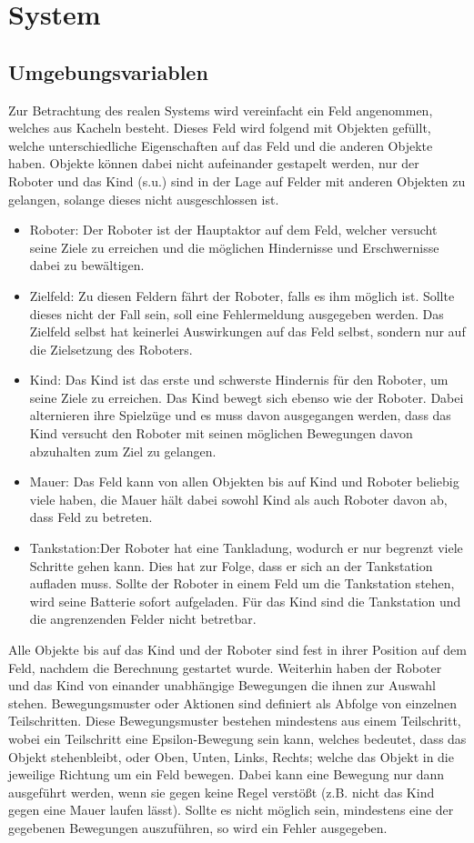 \section{System}
\subsection{Umgebungsvariablen}
Zur Betrachtung des realen Systems wird vereinfacht ein Feld angenommen, welches aus Kacheln besteht. Dieses Feld wird folgend mit Objekten gefüllt, welche unterschiedliche Eigenschaften auf das Feld und die anderen Objekte haben. Objekte können dabei nicht aufeinander gestapelt werden, nur der Roboter und das Kind (s.u.) sind in der Lage auf Felder mit anderen Objekten zu gelangen, solange dieses nicht ausgeschlossen ist.
\begin{itemize}
	\item Roboter: Der Roboter ist der Hauptaktor auf dem Feld, welcher versucht seine Ziele zu erreichen und die möglichen Hindernisse und Erschwernisse dabei zu bewältigen.
	\item Zielfeld: Zu diesen Feldern fährt der Roboter, falls es ihm möglich ist. Sollte dieses nicht der Fall sein, soll eine Fehlermeldung ausgegeben werden. Das Zielfeld selbst hat keinerlei Auswirkungen auf das Feld selbst, sondern nur auf die Zielsetzung des Roboters.
	\item Kind: Das Kind ist das erste und schwerste Hindernis für den Roboter, um seine Ziele zu erreichen. Das Kind bewegt sich ebenso wie der Roboter. Dabei alternieren ihre Spielzüge und es muss davon ausgegangen werden, dass das Kind versucht den Roboter mit seinen möglichen Bewegungen davon abzuhalten zum Ziel zu gelangen.
	\item Mauer: Das Feld kann von allen Objekten bis auf Kind und Roboter beliebig viele haben, die Mauer hält dabei sowohl Kind als auch Roboter davon ab, dass Feld zu betreten.
	\item Tankstation:Der Roboter hat eine Tankladung, wodurch er nur begrenzt viele Schritte gehen kann. Dies hat zur Folge, dass er sich an der Tankstation aufladen muss. Sollte der Roboter in einem Feld um die Tankstation stehen, wird seine Batterie sofort aufgeladen. Für das Kind sind die Tankstation und die angrenzenden Felder nicht betretbar.
\end{itemize}
Alle Objekte bis auf das Kind und der Roboter sind fest in ihrer Position auf dem Feld, nachdem die Berechnung gestartet wurde. Weiterhin haben der Roboter und das Kind von einander unabhängige Bewegungen die ihnen zur Auswahl stehen. Bewegungsmuster oder Aktionen sind definiert als Abfolge von einzelnen Teilschritten. Diese Bewegungsmuster bestehen mindestens aus einem Teilschritt, wobei ein Teilschritt eine Epsilon-Bewegung sein kann, welches bedeutet, dass das Objekt stehenbleibt, oder Oben, Unten, Links, Rechts; welche das Objekt in die jeweilige Richtung um ein Feld bewegen. Dabei kann eine Bewegung nur dann ausgeführt werden, wenn sie gegen keine Regel verstößt (z.B. nicht das Kind gegen eine Mauer laufen lässt). Sollte es nicht möglich sein, mindestens eine der gegebenen Bewegungen auszuführen, so wird ein Fehler ausgegeben. \\
